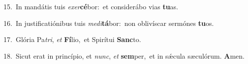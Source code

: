 {\numbfont\textcolor{\numbcolor}{15.}}~In mandátis tuis \textit{ex}\-\textit{er}\textbf{cé}bor:~\star et considerábo vias \textbf{tu}\-as.\par
{\numbfont\textcolor{\numbcolor}{16.}}~In justificatiónibus tuis \textit{me}\-\textit{di}\textbf{tá}bor:~\star non oblivíscar sermónes \textbf{tu}\-os.\par
{\numbfont\textcolor{\numbcolor}{17.}}~Glória Pa\-\textit{tri}\-, \textit{et} \textbf{Fí}\-lio,~\star et Spirítui \textbf{Sanc}\-to.\par
{\numbfont\textcolor{\numbcolor}{18.}}~Sicut erat in princípio, et \textit{nunc}\-, \textit{et} \textbf{sem}\-per,~\star et in sǽcula sæculórum. \textbf{A}\-men.\par
